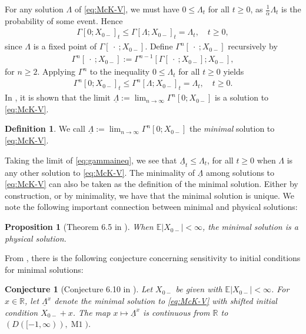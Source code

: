 \documentclass[12pt]{amsart}
\newcommand{\R}{\mathbb{R}}
\newcommand{\ubar}{\underline}
\newcommand{\E}{\mathbb{E}}
\theoremstyle{plain}
\newtheorem{prop}[thm]{Proposition}
\newtheorem*{conj}{Conjecture}
\theoremstyle{definition}
\newtheorem{defn}[thm]{Definition}
\begin{document}
For any solution $\Lambda$ of \eqref{eq:McK-V}, we must have $0\le \Lambda_t$ for all $t\ge 0$, as $\frac{1}{\alpha}\Lambda_t$ is the probability of some event. Hence
\begin{align}
\Gamma[0;X_{0-}]_t\le \Gamma[\Lambda;X_{0-}]_t=\Lambda_t,\quad t\ge 0,
\end{align}
since $\Lambda$ is a fixed point of $\Gamma[~\cdot~;X_{0-}]$. Define $\Gamma^n[~\cdot~;X_{0-}]$ recursively by
\begin{align}
\Gamma^n[~\cdot~;X_{0-}]:=\Gamma^{n-1}[\Gamma[~\cdot~;X_{0-}];X_{0-}],
\end{align}
for $n\ge 2$. Applying $\Gamma^n$ to the inequality $0\le \Lambda_t$ for all $t\ge 0$ yields 
\begin{align}\label{eq:gammaineq}
\Gamma^n[0;X_{0-}]_t\le \Gamma^n[\Lambda;X_{0-}]_t=\Lambda_t,\quad t\ge 0.
\end{align}
In \cite[Proposition 2.3]{cuchiero_propagation_2020}, it is shown that the limit $\ubar{\Lambda}:=\lim_{n\to \infty}\Gamma^n[0;X_{0-}]$ is a solution to \eqref{eq:McK-V}.
\begin{defn}
We call $\ubar{\Lambda}:=\lim_{n\to \infty}\Gamma^n[0;X_{0-}]$ the \emph{minimal} solution to \eqref{eq:McK-V}.
\end{defn}
Taking the limit of \eqref{eq:gammaineq}, we see that $\ubar{\Lambda}_t\le\Lambda_t$, for all $t\ge 0$ when $\Lambda$ is any other solution to \eqref{eq:McK-V}.
The minimality of $\ubar{\Lambda}$ among solutions to \eqref{eq:McK-V} can also be taken as the definition of the minimal solution. Either by construction, or by minimality, we have that the minimal solution is unique. We note the following important connection between minimal and physical solutions:
\begin{prop}[Theorem 6.5 in \cite{cuchiero_propagation_2020}]\label{prop:minisphys}
When $\E|X_{0-}|<\infty$, the minimal solution is a physical solution.
\end{prop}
From \cite{cuchiero_propagation_2020}, there is the following conjecture concerning sensitivity to initial conditions for minimal solutions:
\begin{conj}[Conjecture 6.10 in \cite{cuchiero_propagation_2020}]
Let $X_{0-}$ be given with $\E|X_{0-}|<\infty$. For $x\in\R$, let $\ubar{\Lambda}^x$ denote the minimal solution to \eqref{eq:McK-V} with shifted initial condition $X_{0-}+x$. The map 
$x\mapsto \ubar{\Lambda}^x$ is continuous from $\R$ to $(D([-1,\infty)),\operatorname{M1})$.
\end{conj}
\end{document}
